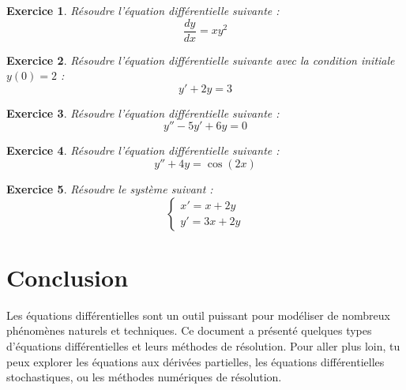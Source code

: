 \documentclass[12pt]{article}
\newtheorem{exercice}{Exercice}
\begin{document}
\begin{exercice}
Résoudre l'équation différentielle suivante :
\[
\frac{dy}{dx} = x y^2
\]
\end{exercice}

\begin{exercice}
Résoudre l'équation différentielle suivante avec la condition initiale $y(0) = 2$ :
\[
y' + 2y = 3
\]
\end{exercice}

\begin{exercice}
Résoudre l'équation différentielle suivante :
\[
y'' - 5y' + 6y = 0
\]
\end{exercice}

\begin{exercice}
Résoudre l'équation différentielle suivante :
\[
y'' + 4y = \cos(2x)
\]
\end{exercice}

\begin{exercice}
Résoudre le système suivant :
\[
\begin{cases}
    x' = x + 2y \\
    y' = 3x + 2y
\end{cases}
\]
\end{exercice}

\section{Conclusion}
Les équations différentielles sont un outil puissant pour modéliser de nombreux phénomènes naturels et techniques. Ce document a présenté quelques types d'équations différentielles et leurs méthodes de résolution. Pour aller plus loin, tu peux explorer les équations aux dérivées partielles, les équations différentielles stochastiques, ou les méthodes numériques de résolution.

\end{document}
